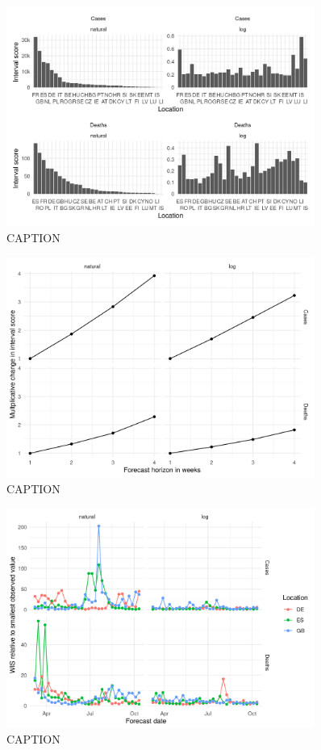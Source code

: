 \documentclass{article}
\begin{document}
\begin{figure}[h!]
    \centering
    \includegraphics[width=0.9\textwidth]{output/figures/HUB-scores-locations.png}
    \caption{CAPTION}
    \label{fig:HUB-scores-location}
\end{figure}

\begin{figure}[h!]
    \centering
    \includegraphics[width=0.9\textwidth]{output/figures/HUB-scores-over-horizon.png}
    \caption{CAPTION}
    \label{fig:HUB-scores-horizon}
\end{figure}

\begin{figure}[h!]
    \centering
    \includegraphics[width=0.9\textwidth]{output/figures/HUB-scores-over-time.png}
    \caption{CAPTION}
    \label{fig:HUB-scores-time}
\end{figure}
\end{document}
